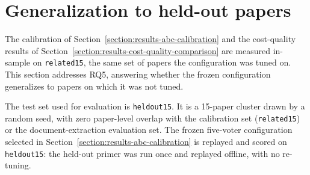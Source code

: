 \section{Generalization to held-out papers}\label{section:results-generalization-to-heldout-papers}

The calibration of Section~\ref{section:results-abc-calibration} and the cost-quality results of Section~\ref{section:results-cost-quality-comparison} are measured in-sample on \texttt{related15}, the same set of papers the configuration was tuned on. This section addresses RQ5, answering whether the frozen configuration generalizes to papers on which it was not tuned.

The test set used for evaluation is \texttt{heldout15}. It is a 15-paper cluster drawn by a random seed, with zero paper-level overlap with the calibration set (\texttt{related15}) or the document-extraction evaluation set. The frozen five-voter configuration selected in Section~\ref{section:results-abc-calibration} is replayed and scored on \texttt{heldout15}: the held-out primer was run once and replayed offline, with no re-tuning.

